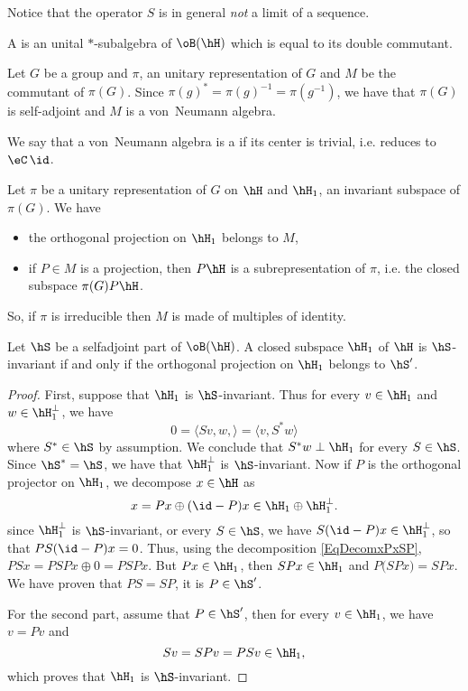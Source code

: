 Notice that the operator $S$ is in general \emph{not} a limit of a sequence.

\begin{definition}
	A  is an unital $*$-subalgebra of $\oB(\hH)$ which is equal to its double commutant.
\end{definition}

Let $G$ be a group and $\pi$, an unitary representation of $G$ and $M$ be the commutant of $\pi(G)$. Since $\pi(g)^*=\pi(g)^{-1}=\pi(g^{-1})$, we have that $\pi(G)$ is self-adjoint and $M$ is a von~Neumann algebra.

We say that a von~Neumann algebra is a  if its center is trivial, i.e. reduces to $\eC\,\id$.

\begin{proposition}	\label{PropprojrepresVN}
	Let $\pi$ be a unitary representation of $G$ on $\hH$ and $\hH_1$, an invariant subspace of $\pi(G)$. We have
	\begin{itemize}
		\item the orthogonal projection on $\hH_1$ belongs to $M$,
		\item if $P\in M$ is a projection, then $P\hH$ is a subrepresentation of $\pi$, i.e. the closed subspace $\pi(G)P\hH$.
	\end{itemize}
\end{proposition}
So, if $\pi$ is irreducible then $M$ is made of multiples of identity.

\begin{lemma}		\label{LeminvarMprime}
	Let $\hS$ be a selfadjoint part of $\oB(\hH)$. A closed subspace $\hH_1$ of $\hH$ is $\hS$-invariant if and only if the orthogonal projection on $\hH_1$ belongs to $\hS'$.
\end{lemma}

\begin{proof}
	First, suppose that $\hH_1$ is $\hS$-invariant. Thus for every $v\in\hH_1$ and $w\in \hH_1^{\perp}$, we have
	\[
		0=\langle Sv,w, \rangle =\langle v, S^*w\rangle
	\]
	where $S^*\in\hS$ by assumption. We conclude that $S^*w\perp\hH_1$ for every $S\in\hS$. Since $\hS^*=\hS$, we have that $\hH_1^{\perp}$ is $\hS$-invariant. Now if $P$ is the orthogonal projector on $\hH_1$, we decompose $x\in\hH$ as
	\begin{equation}		\label{EqDecomxPxSP}
		x=Px\oplus(\id-P)x\in\hH_1\oplus\hH_1^{\perp}.
	\end{equation}
	since $\hH_1^{\perp}$ is $\hS$-invariant, or every $S\in\hS$, we have $S(\id-P)x\in\hH_1^{\perp}$, so that $PS(\id-P)x=0$. Thus, using the decomposition \eqref{EqDecomxPxSP}, $PSx=PSPx\oplus 0=PSPx$. But $Px\in \hH_1$, then $SPx\in\hH_1$ and $P\big( SPx \big)=SPx$. We have proven that $PS=SP$, it is $P\in\hS'$.

	For the second part, assume that $P\in\hS'$, then for every $v\in\hH_1$, we have $v=Pv$ and
	\[
		Sv=SPv=PSv\in\hH_1,
	\]
	which proves that $\hH_1$ is $\hS$-invariant.
\end{proof}


